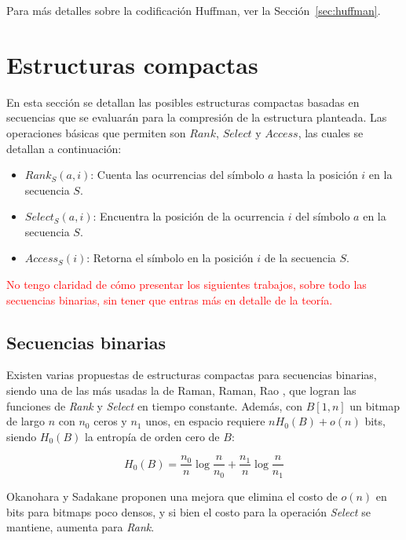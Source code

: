 Para más detalles sobre la codificación Huffman, ver la Sección~\ref{sec:huffman}.



\section{Estructuras compactas} \label{sec:compactEstruct}
En esta sección se detallan las posibles estructuras compactas basadas en secuencias que se evaluarán para la compresión de la estructura planteada. Las operaciones básicas que permiten son \textbf{$Rank$}, \textbf{$Select$} y \textbf{$Access$}, las cuales se detallan a continuación:

\begin{itemize}
	\item \textbf{$Rank_{S}(a, i)$}: Cuenta las ocurrencias del símbolo $a$ hasta la posición $i$ en la secuencia $S$.
	\item \textbf{$Select_{S}(a, i)$}: Encuentra la posición de la ocurrencia $i$ del símbolo $a$ en la secuencia $S$.
	\item \textbf{$Access_{S}(i)$}: Retorna el símbolo en la posición $i$ de la secuencia $S$.
\end{itemize}

\textcolor{red}{No tengo claridad de cómo presentar los siguientes trabajos, sobre todo las secuencias binarias, sin tener que entras más en detalle de la teoría.}

\subsection{Secuencias binarias}
Existen varias propuestas de estructuras compactas para secuencias binarias, siendo una de las más usadas la de Raman, Raman, Rao \cite{raman2002succinct}, que logran las funciones de \textit{Rank} y \textit{Select} en tiempo constante. Además, con $B[1, n]$ un bitmap de largo $n$ con $n_{0}$ ceros y $n_{1}$ unos, en espacio requiere $nH_{0}(B) + o(n)$ bits, siendo $H_{0}(B)$ la entropía de orden cero de $B$: 

\begin{equation}
	H_{0}(B) = \frac{n_{0}}{n} \log\frac{n}{n_{0}} + \frac{n_{1}}{n} \log\frac{n}{n_{1}}
\end{equation}

Okanohara y Sadakane \cite{DBLP:journals/corr/abs-cs-0610001} proponen una mejora que elimina el costo de $o(n)$ en bits para bitmaps poco densos, y si bien el costo para la operación \textit{Select} se mantiene, aumenta para \textit{Rank}.



